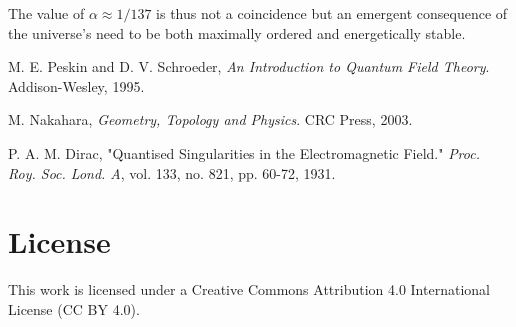 \documentclass[12pt, a4paper]{article}
\begin{document}
The value of \( \alpha \approx 1/137 \) is thus not a coincidence but an emergent consequence of the universe's need to be both maximally ordered and energetically stable.

\begin{thebibliography}{9}

M. E. Peskin and D. V. Schroeder,
\textit{An Introduction to Quantum Field Theory}.
Addison-Wesley, 1995.

M. Nakahara,
\textit{Geometry, Topology and Physics}.
CRC Press, 2003.

P. A. M. Dirac,
"Quantised Singularities in the Electromagnetic Field."
\textit{Proc. Roy. Soc. Lond. A}, vol. 133, no. 821, pp. 60-72, 1931.

\end{thebibliography}


\section*{License}
This work is licensed under a Creative Commons Attribution 4.0 International License (CC BY 4.0).
\end{document}
